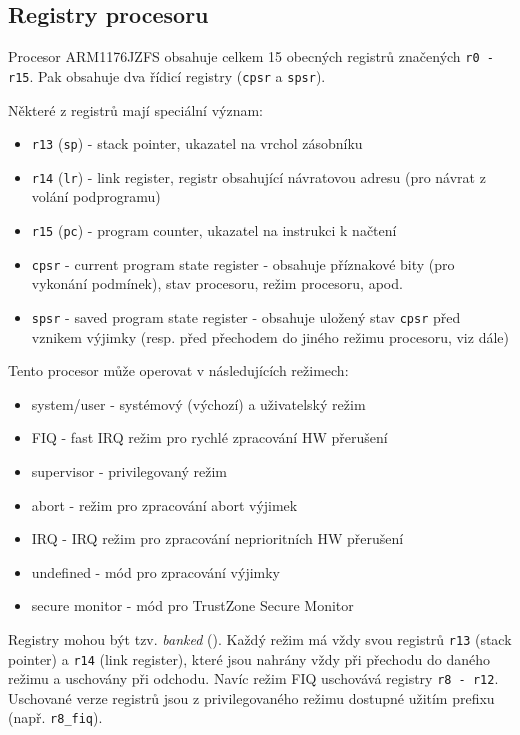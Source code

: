 \documentclass{article}
\begin{document}
\subsection{Registry procesoru}

Procesor ARM1176JZFS obsahuje celkem 15 obecných registrů značených \texttt{r0 - r15}. Pak obsahuje dva řídicí registry (\texttt{cpsr} a \texttt{spsr}).

Některé z registrů mají speciální význam:
\begin{itemize}
	\item \texttt{r13} (\texttt{sp}) - stack pointer, ukazatel na vrchol zásobníku
	\item \texttt{r14} (\texttt{lr}) - link register, registr obsahující návratovou adresu (pro návrat z volání podprogramu)
	\item \texttt{r15} (\texttt{pc}) - program counter, ukazatel na instrukci k načtení
	\item \texttt{cpsr} - current program state register - obsahuje příznakové bity (pro vykonání podmínek), stav procesoru, režim procesoru, apod.
	\item \texttt{spsr} - saved program state register - obsahuje uložený stav \texttt{cpsr} před vznikem výjimky (resp. před přechodem do jiného režimu procesoru, viz dále)
\end{itemize}

Tento procesor může operovat v následujících režimech:
\begin{itemize}
	\item system/user - systémový (výchozí) a uživatelský režim
	\item FIQ - fast IRQ režim pro rychlé zpracování HW přerušení
	\item supervisor - privilegovaný režim
	\item abort - režim pro zpracování abort výjimek
	\item IRQ - IRQ režim pro zpracování neprioritních HW přerušení
	\item undefined - mód pro zpracování výjimky 
	\item secure monitor - mód pro TrustZone Secure Monitor
\end{itemize}

Registry mohou být tzv. \emph{banked} (). Každý režim má vždy svou  registrů \texttt{r13} (stack pointer) a \texttt{r14} (link register), které jsou nahrány vždy při přechodu do daného režimu a uschovány při odchodu. Navíc režim FIQ uschovává registry \texttt{r8 - r12}. Uschované verze registrů jsou z privilegovaného režimu dostupné užitím prefixu (např. \texttt{r8\_fiq}).
\end{document}
